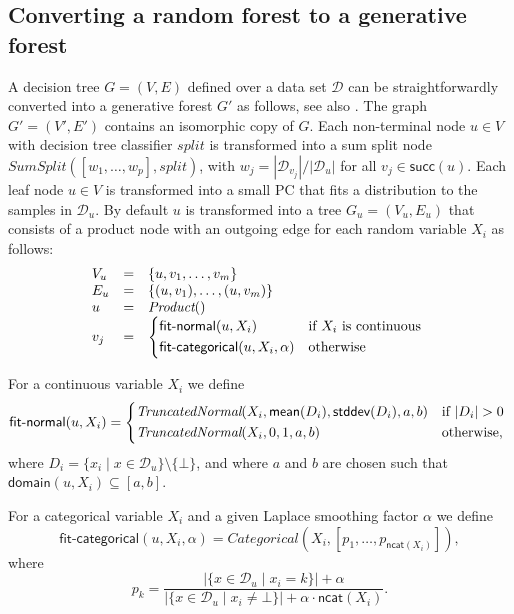 \documentclass{article}
\newcommand{\func}[1]{\ensuremath{\textsf{#1}}} %
\newcommand{\obj}[1]{\ensuremath{\textit{#1}}} %
\newcommand{\set}[1]{\ensuremath{\{ #1 \} }} %
\begin{document}
\subsection{Converting a random forest to a generative forest}

A decision tree $G = (V,E)$ defined over a data set $\mathcal{D}$ can be straightforwardly converted into a generative forest $G'$ as follows, see also \cite{correia2020joints}.
The graph $G' = (V',E')$ contains an isomorphic copy of $G$. Each non-terminal node $u \in V$ with decision tree classifier $\obj{split}$ is transformed into a sum split node 
$\obj{SumSplit}([w_1, \ldots, w_p], \obj{split})$, with $w_j = |\mathcal{D}_{v_j}| / |\mathcal{D}_{u}|$ for all $v_j \in \func{succ}(u)$. Each leaf node $u \in V$ is transformed into a small PC that fits a distribution to the samples in $\mathcal{D}_u$. By default $u$ is transformed into a tree $G_u = (V_u, E_u)$ that consists of a product node with an outgoing edge for each random variable $X_i$ as follows:
\[
\begin{array}{lll}
     V_u & = & \set{u, v_1, \ldots, v_m}  \\
     E_u & = & \set{(u,v_1), \ldots, (u,v_m)} \\
     u & = & \obj{Product}() \\
     v_j & = & 
       \begin{cases*}
         \func{fit-normal}(u, X_i) & if $X_i$ is continuous \\
         \func{fit-categorical}(u, X_i, \alpha) & otherwise
       \end{cases*}
\end{array}
\]

\vspace{0.5cm}
\noindent
For a continuous variable $X_i$ we define
\[
\func{fit-normal}(u, X_i) =
\begin{cases*}
\obj{TruncatedNormal}(X_i, \func{mean}(D_i), \func{stddev}(D_i), a, b) & if $|D_i| > 0$ \\
\obj{TruncatedNormal}(X_i, 0, 1, a, b) & otherwise,
\end{cases*}
\]
where $D_i = \set{x_i \mid x \in \mathcal{D}_u} \setminus \set{\bot}$, and where $a$ and $b$ are chosen such that $\func{domain}(u,X_i) \subseteq{[a,b]}$.

\vspace{0.5cm}
\noindent
For a categorical variable $X_i$ and a given Laplace smoothing factor $\alpha$ we define
\[
\func{fit-categorical}(u, X_i, \alpha) =
\obj{Categorical}(X_i, [p_1, \ldots, p_{\func{ncat}(X_i)}]),
\]
where
\[
p_k = \frac
  { |\set{x \in \mathcal{D}_u \mid x_i = k}| + \alpha }
  { |\set{x \in \mathcal{D}_u \mid x_i \neq \bot}| + \alpha \cdot \func{ncat}(X_i) }.
\]
\end{document}
